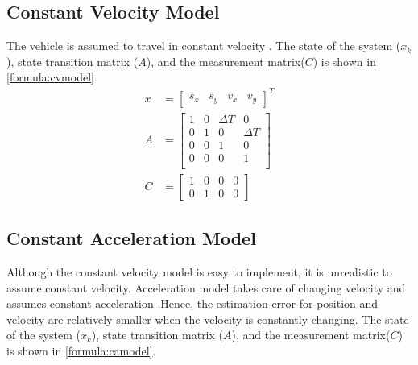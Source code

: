 \subsection{Constant Velocity Model}
The vehicle is assumed to travel in constant velocity \cite{Schubert2008}. The state of the system ($x_k$), state transition matrix ($A$), and the measurement matrix($C$) is shown in \eqref{formula:cvmodel}.
\begin{equation}
\label{formula:cvmodel}
\begin{split}
x &=
\left[\begin{matrix}
s_x & s_y & v_x & v_y
\end{matrix}\right]^{T}\\
A&= \left[\begin{matrix}
1 & 0 & \Delta T & 0\\
0 & 1 & 0 & \Delta T\\
0 & 0 & 1 & 0\\
0 & 0 & 0 & 1\\
\end{matrix}\right]\\
C&= \left[\begin{matrix}
1 & 0 & 0 & 0\\
0 & 1 & 0 & 0
\end{matrix}\right]
\end{split}
\end{equation}

\subsection{Constant Acceleration Model}
Although the constant velocity model is easy to implement, it is unrealistic to assume constant velocity. Acceleration model takes care of changing velocity and assumes constant acceleration \cite{Schubert2008}.Hence, the estimation error for position and velocity are relatively smaller when the velocity is constantly changing. The state of the system ($x_k$), state transition matrix ($A$), and the measurement matrix($C$) is shown in \eqref{formula:camodel}.

